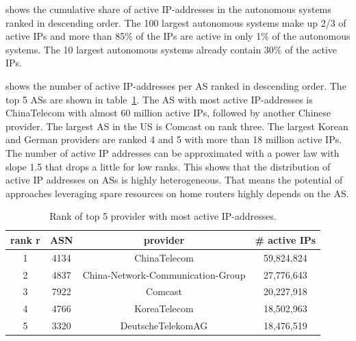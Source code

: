  shows the cumulative share of active IP-addresses in the autonomous systems ranked in descending order.
The 100 largest autonomous systems make up 2/3 of active IPs and more than 85\% of the IPs are active in only 1\% of the autonomous systems. The 10 largest autonomous systems already contain 30\% of the active IPs.

 shows the number of active IP-addresses per AS ranked in descending order.
The top 5 ASs are shown in table~\ref{tab:asrank}.
The AS with most active IP-addresses is ChinaTelecom with almost 60 million active IPs, followed by another Chinese provider.
The largest AS in the US is Comcast on rank three.
The largest Korean and German providers are ranked 4 and 5 with more than 18 million active IPs.
The number of active IP addresses can be approximated with a power law with slope 1.5 that drops a little for low ranks.
This shows that the distribution of active IP addresses on ASs is highly heterogeneous.
That means the potential of approaches leveraging spare resources on home routers highly depends on the AS.

\begin{table}[tb]
\centering
\caption{Rank of top 5 provider with most active IP-addresses.}
\label{tab:asrank}
\begin{tabular}{|c|c|c|c|}
\hline
rank r & ASN & provider & \# active IPs  \\
\hline
1 & 4134 & ChinaTelecom & 59,824,824 \\
2 & 4837 & China-Network-Communication-Group & 27,776,643 \\
3 & 7922 & Comcast & 20,227,918 \\
4 & 4766 & KoreaTelecom & 18,502,963 \\
5 & 3320 & DeutscheTelekomAG & 18,476,519 \\
\hline
\end{tabular}
\end{table}
